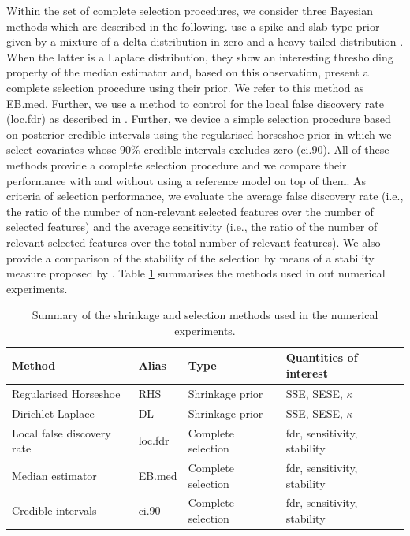 \documentclass[american,]{article}
\theoremstyle{definition}
\begin{document}
Within the set of complete selection procedures, we consider three 
Bayesian methods which are described in the following.
\cite{johnstone2004needles} use a spike-and-slab type prior given by a mixture of a delta distribution in zero and a heavy-tailed distribution \cite[see also][]{paper:spike_slab_mitchell}. When the latter is a Laplace distribution, they show an interesting thresholding property of the median estimator and, based on this observation, present a complete selection procedure using their prior. We refer to this method as EB.med. Further, we use a method to control for the local false discovery rate (loc.fdr) as described in \cite{paper:efron, efron2012large}. Further, we device a simple selection procedure based on posterior credible intervals using the regularised horseshoe prior in which we select covariates whose 90\% credible intervals excludes zero (ci.90). All of these methods provide a complete selection procedure and we compare their performance with and without using a reference model on top of them. As criteria of selection performance, we evaluate the average false discovery rate (i.e., the ratio of the number of non-relevant selected features over the number of selected features) and the average sensitivity (i.e., the ratio of the number of relevant selected features over the total number of relevant features). We also provide a comparison of the stability of the selection by means of a stability measure proposed by \cite{paper:stability}. Table \ref{tab:comparison} summarises the methods used in out numerical experiments.

\begin{table}[tp]
\scriptsize
\centering
\begin{tabular}{l|l|l|l}
  \hline
 Method & Alias & Type & Quantities of interest \\ 
  \hline
 Regularised Horseshoe & RHS & Shrinkage prior & SSE, SESE, $\kappa$ \\
 Dirichlet-Laplace & DL & Shrinkage prior & SSE, SESE, $\kappa$ \\
 Local false discovery rate & loc.fdr & Complete selection & fdr, sensitivity, stability \\
 Median estimator & EB.med & Complete selection & fdr, sensitivity, stability \\
 Credible intervals & ci.90 & Complete selection & fdr, sensitivity, stability \\
 \hline
\end{tabular}
\caption{Summary of the shrinkage and selection methods used in the numerical experiments.}
\label{tab:comparison}
\end{table}
\end{document}
